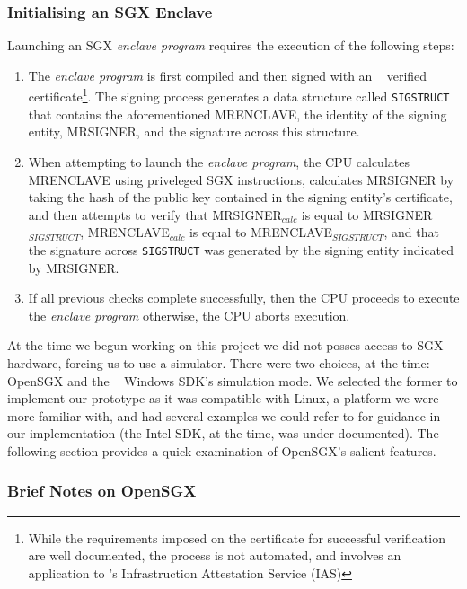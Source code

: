 \documentclass[../main.tex]{subfiles}
\begin{document}
\subsubsection{Initialising an SGX Enclave}

Launching an SGX \textit{enclave program} requires the execution of
the following steps:

\begin{enumerate}
  \item The \textit{enclave program} is first compiled and then signed
    with an \Intel~ verified certificate\footnote{While the requirements
    imposed on the certificate for successful verification are well
    documented, the process is not automated, and involves an application
    to \Intel's Infrastruction Attestation Service (IAS)}. The signing
    process generates a data structure called \texttt{SIGSTRUCT} that
    contains the aforementioned MRENCLAVE, the identity of the signing
    entity, MRSIGNER, and the signature across this structure.
  \item When attempting to launch the \textit{enclave program}, the
    CPU calculates MRENCLAVE using priveleged SGX instructions, calculates
    MRSIGNER by taking the hash of the public key contained in the signing
    entity's certificate, and then attempts to verify that
    MRSIGNER$_{calc}$ is equal to MRSIGNER$_{SIGSTRUCT}$,
    MRENCLAVE$_{calc}$ is equal to MRENCLAVE$_{SIGSTRUCT}$, and that the
    signature across \texttt{SIGSTRUCT} was generated by the signing
    entity indicated by MRSIGNER.
  \item If all previous checks complete successfully, then the CPU
    proceeds to execute the \textit{enclave program} otherwise, the CPU
    aborts execution.
\end{enumerate}

At the time we begun working on this project we did not posses access
to SGX hardware, forcing us to use a simulator. There were two
choices, at the time: OpenSGX and the \Intel~ Windows SDK's simulation
mode. We selected the former to implement our prototype as it was
compatible with Linux, a platform we were more familiar with, and had
several examples we could refer to for guidance in our implementation
(the Intel SDK, at the time, was under-documented). The following
section provides a quick examination of OpenSGX's salient features.


\subsubsection{Brief Notes on OpenSGX}

\end{document}
